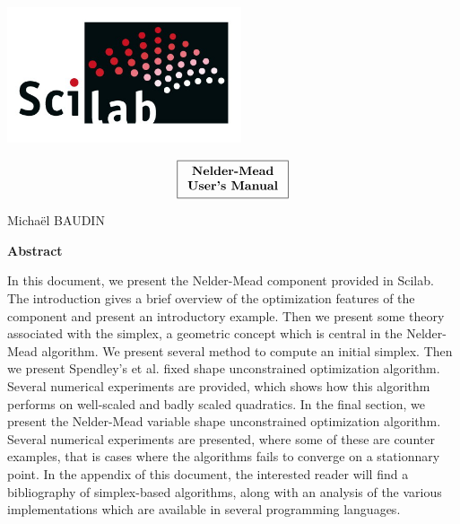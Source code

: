 \documentclass[12pt]{report}
\begin{document}
\pagestyle{fancyplain}
\renewcommand{\chaptermark}[1]{\markboth{\chaptername\ \thechapter. #1}{}}
\renewcommand{\sectionmark}[1]{\markright{\thesection. #1}}
\lhead[]{\fancyplain{}{\bfseries\leftmark}}
\rhead[]{\fancyplain{}{\bfseries\thepage}}
\cfoot{}

\makeatletter
\def\figurename{{\protect\sc \protect\small\bfseries Fig.}}
\def\f@ffrench{\protect\figurename\space{\protect\small\bf \thefigure}\space}
\let\fnum@figure\f@ffrench%
\let\captionORI\caption
\def\caption#1{\captionORI{\rm\small #1}}
\makeatother

\thispagestyle{empty}
{
\begin{center}
\includegraphics[height=40mm]{scilab_logo}
\vskip2cm

\Huge
$$\fbox{$
  \begin{array}{c}
  \textbf{Nelder-Mead}\\
  \textbf{User's Manual}
  \end{array}
  $}
$$
\end{center}

\vskip1cm

\begin{center}
\begin{large}
Micha\"el BAUDIN
\end{large}
\end{center}

\vskip2cm

\textbf{Abstract}

In this document, we present the Nelder-Mead component provided in Scilab.
The introduction gives a brief overview of the optimization features of the 
component and present an introductory example. Then we present some theory 
associated with the simplex, a geometric concept which is central in
the Nelder-Mead algorithm. We present several method to compute an
initial simplex. Then we present Spendley's et al. fixed shape unconstrained 
optimization algorithm. Several numerical experiments are provided, which 
shows how this algorithm performs on well-scaled and badly scaled quadratics. 
In the final section, we present the Nelder-Mead variable shape 
unconstrained optimization algorithm. Several numerical experiments are presented,
where some of these are counter examples, that is cases where the algorithms 
fails to converge on a stationnary point. In the appendix of this document,
the interested reader will find a bibliography of simplex-based algorithms,
along with an analysis of the various implementations which are available 
in several programming languages.

}
\end{document}
